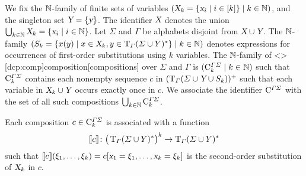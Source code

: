 \documentclass[../../document.tex]{subfiles}
\begin{document}
    \begin{definition}[Composition]
        We fix the \(\mathbb{N}\)-family of finite sets of variables \((\textsl{X}_k = \{\textsl{x}_i \mid i \in [k]\} \mid k \in \mathbb{N})\), and the singleton set \(\textsl{Y} = \{\textsl{y}\}\).
        The identifier \(\textsl{X}\) denotes the union \(\bigcup_{k \in \mathbb{N}} \textsl{X}_k = \{\textsl{x}_i \mid i \in \mathbb{N}\}\).
        Let \(\varSigma\) and \(\varGamma\) be alphabets disjoint from \(\textsl{X} \cup \textsl{Y}\).
        The \(\mathbb{N}\)-family \((S_k = \{x(y) \mid x \in \textsl{X}_k, y \in \operatorname{T}_\varGamma(\varSigma \cup Y)^*\} \mid k \in \mathbb{N})\) denotes expressions for occurrences of first-order substitutions using \(k\) variables.
        The \(\mathbb{N}\)-family of  <\dcp>[dcp:comp]{composition}[compositions] over \(\varSigma\) and \(\varGamma\) is \((\mathrm{C}^{\varGamma\varSigma}_k \mid k \in \mathbb{N})\) such that \(\mathrm{C}^{\varGamma\varSigma}_k\) contains each nonempty sequence \(c\) in \((\operatorname{T}_\varGamma(\varSigma \cup \textsl{Y} \cup S_k))^+\) such that each variable in \(\textsl{X}_k \cup \textsl{Y}\) occurs exactly once in \(c\).
        We associate the identifier \(\mathrm{C}^{\varGamma\varSigma}\) with the set of all such  compositions \(\bigcup_{k \in \mathbb{N}} \mathrm{C}^{\varGamma\varSigma}_{k}\).

        Each composition \(c \in \mathrm{C}^{\varGamma\varSigma}_k\) is associated with a function \[
        \llbracket c\rrbracket\colon \big(\operatorname{T}_\varGamma(\varSigma \cup Y)^*\big)^k \to \operatorname{T}_\varGamma(\varSigma \cup Y)^*
        \] such that \(\llbracket c\rrbracket(\xi_1, \ldots, \xi_k) = c[\textsl{x}_1=\xi_1, \ldots, \textsl{x}_k=\xi_k]\) is the second-order substitution of \(\textsl{X}_k\) in \(c\).
    \end{definition}

\end{document}
